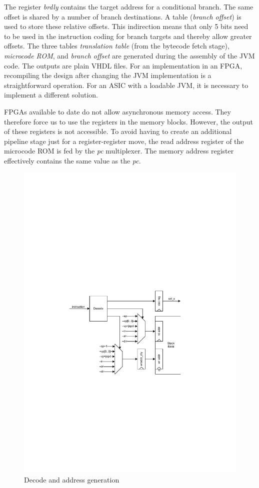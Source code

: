 The register \emph{brdly} contains the target address for a
conditional branch. The same offset is shared by a number of branch
destinations. A table (\emph{branch offset}) is used to store these
relative offsets. This indirection means that only 5 bits need to be
used in the instruction coding for branch targets and thereby allow
greater offsets. The three tables \emph{translation table} (from the
bytecode fetch stage), \emph{microcode ROM}, and \emph{branch offset}
are generated during the assembly of the JVM code. The outputs are
plain VHDL files. For an implementation in an FPGA, recompiling the
design after changing the JVM implementation is a straightforward
operation. For an ASIC with a loadable JVM, it is necessary to
implement a different solution.

FPGAs available to date do not allow asynchronous memory access. They
therefore force us to use the registers in the memory blocks.
However, the output of these registers is not accessible. To avoid
having to create an additional pipeline stage just for a
register-register move, the read address register of the microcode
ROM is fed by the \emph{pc} multiplexer. The memory address register
effectively contains the same value as the \emph{pc}.

\begin{figure}[t]
    \centering
    \includegraphics[scale=\picscale]{arch/arch_decaddr}
    \caption{Decode and address generation}
    \label{fig_arch_decode}
\end{figure}

